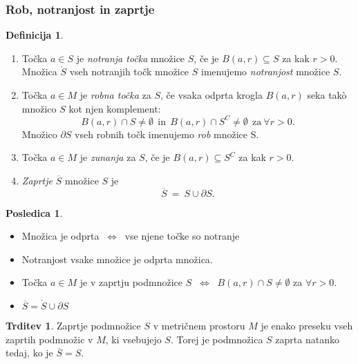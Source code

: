 \documentclass[11pt]{article}
\theoremstyle{definition}
\newtheorem{definicija}{Definicija}[section]
\theoremstyle{definition}
\newtheorem{trditev}{Trditev}[section]
\theoremstyle{definition}
\newtheorem*{posledica}{Posledica}
\begin{document}
\subsubsection{Rob, notranjost in zaprtje}
\vspace{0.5cm}

\begin{definicija}
~
\begin{enumerate}
	\item Točka $a \in S$ je \textit{notranja točka} množice $S$, če je $B(a, r) \subseteq S$ za kak $r > 0$. Množica $\mathring{S}$ vseh notranjih točk množice $S$ imenujemo \textit{notranjost} množice $S$.
	\item Točka $a \in M$ je \textit{robna točka} za $S$, če vsaka odprta krogla $B(a, r)$ seka takò množico $S$ kot njen komplement:
	$$B(a, r) \cap S \neq \emptyset ~~\text{in}~~ B(a, r) \cap S^C \neq \emptyset ~~\text{za}~ \forall r > 0.$$
	Množico $\partial S$ vseh robnih točk imenujemo \textit{rob} množice S.
	\item Točka $a \in M$ je \textit{zunanja} za $S$, če je $B(a, r) \subseteq S^C$ za kak $r > 0$.
	\item \textit{Zaprtje} $\overline{S}$ množice $S$ je 
	$$\overline{S} ~=~ S \cup \partial S.$$
\end{enumerate}

\end{definicija}
\vspace{0.5cm}

\begin{posledica}
~
\begin{itemize}
	\item Množica je odprta $~\Leftrightarrow~$ vse njene točke so notranje
	\item Notranjost vsake množice je odprta množica.
	\item Točka $a \in M$ je v zaprtju podmnožice $S$ $~\Leftrightarrow~$ $B(a, r) \cap S \neq \emptyset$ za $\forall r > 0$.
	\item $\overline{S} = \mathring{S} \cup \partial S$
\end{itemize}

\end{posledica}
\vspace{0.5cm}

\begin{trditev}

Zaprtje podmnožice $S$ v metričnem prostoru $M$ je enako preseku vseh zaprtih podmnožic v $M$, ki vsebujejo $S$. Torej je podmnožica $S$ zaprta natanko tedaj, ko je $\overline{S} = S$.

\end{trditev}
\vspace{0.5cm}
\end{document}
